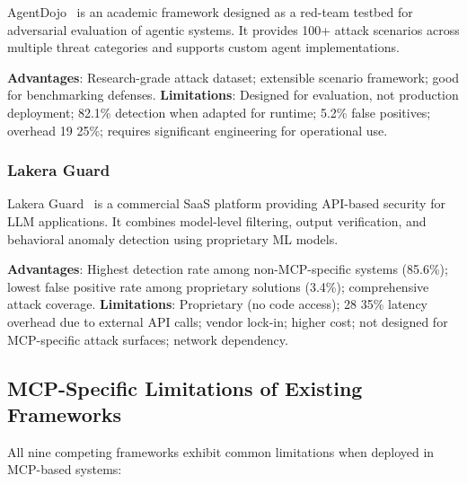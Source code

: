\documentclass[12pt,twocolumn,journal]{IEEEtran}
\begin{document}
AgentDojo~\cite{AgentDojo2024} is an academic framework designed as a red-team testbed for adversarial evaluation of agentic systems. It provides 100+ attack scenarios across multiple threat categories and supports custom agent implementations.

\textbf{Advantages}: Research-grade attack dataset; extensible scenario framework; good for benchmarking defenses.
\textbf{Limitations}: Designed for evaluation, not production deployment; 82.1\% detection when adapted for runtime; 5.2\% false positives; overhead 19 25\%; requires significant engineering for operational use.

\subsubsection{Lakera Guard}

Lakera Guard~\cite{LakeraGuard2024} is a commercial SaaS platform providing API-based security for LLM applications. It combines model-level filtering, output verification, and behavioral anomaly detection using proprietary ML models.

\textbf{Advantages}: Highest detection rate among non-MCP-specific systems (85.6\%); lowest false positive rate among proprietary solutions (3.4\%); comprehensive attack coverage.
\textbf{Limitations}: Proprietary (no code access); 28 35\% latency overhead due to external API calls; vendor lock-in; higher cost; not designed for MCP-specific attack surfaces; network dependency.

\subsection{MCP-Specific Limitations of Existing Frameworks}

All nine competing frameworks exhibit common limitations when deployed in MCP-based systems:
\end{document}

